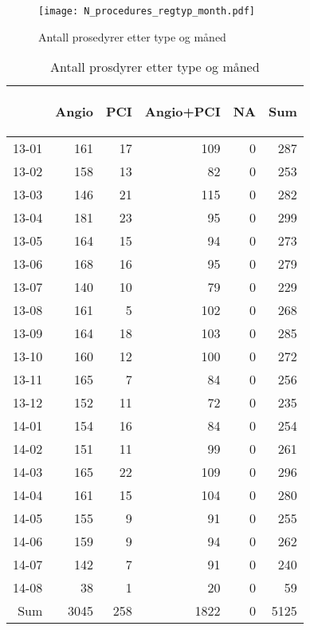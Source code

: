 \documentclass[presentation,xcolor=pdftex,dvipsnames,table]{beamer}
\begin{document}

\begin{frame}
\begin{figure}
  \centering
  \caption{Antall prosedyrer etter type og måned}
\texttt{[image: N\_procedures\_regtyp\_month.pdf]}
\end{figure}\end{frame}

\begin{frame}
\begin{tiny}
\begin{table}[ht]
\centering
\begin{tabular}{rrrrrr}
  \toprule
 & \begin{sideways} Angio \end{sideways} & \begin{sideways} PCI \end{sideways} & \begin{sideways} Angio+PCI \end{sideways} & \begin{sideways} NA \end{sideways} & \begin{sideways} Sum \end{sideways} \\ 
  \midrule
13-01 & 161 & 17 & 109 & 0 & 287 \\ 
  13-02 & 158 & 13 & 82 & 0 & 253 \\ 
  13-03 & 146 & 21 & 115 & 0 & 282 \\ 
  13-04 & 181 & 23 & 95 & 0 & 299 \\ 
  13-05 & 164 & 15 & 94 & 0 & 273 \\ 
  13-06 & 168 & 16 & 95 & 0 & 279 \\ 
  13-07 & 140 & 10 & 79 & 0 & 229 \\ 
  13-08 & 161 & 5 & 102 & 0 & 268 \\ 
  13-09 & 164 & 18 & 103 & 0 & 285 \\ 
  13-10 & 160 & 12 & 100 & 0 & 272 \\ 
  13-11 & 165 & 7 & 84 & 0 & 256 \\ 
  13-12 & 152 & 11 & 72 & 0 & 235 \\ 
  14-01 & 154 & 16 & 84 & 0 & 254 \\ 
  14-02 & 151 & 11 & 99 & 0 & 261 \\ 
  14-03 & 165 & 22 & 109 & 0 & 296 \\ 
  14-04 & 161 & 15 & 104 & 0 & 280 \\ 
  14-05 & 155 & 9 & 91 & 0 & 255 \\ 
  14-06 & 159 & 9 & 94 & 0 & 262 \\ 
  14-07 & 142 & 7 & 91 & 0 & 240 \\ 
  14-08 & 38 & 1 & 20 & 0 & 59 \\ 
  Sum & 3045 & 258 & 1822 & 0 & 5125 \\ 
   \bottomrule
\end{tabular}
\caption{Antall prosdyrer etter type og måned} 
\end{table}\end{tiny}
\end{frame}
\end{document}
